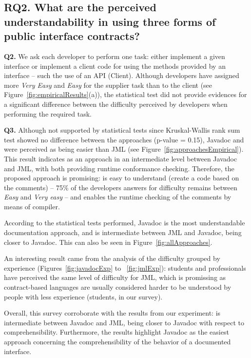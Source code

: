 \subsection{RQ2. What are the perceived understandability in using three forms of public interface contracts?}
\label{rq2}



\textbf{Q2.} We ask each developer to perform one task:
either implement a given interface or implement a client code for using the
methods provided by an interface -- such the use of an API (Client). 
Although developers have assigned more \emph{Very Easy} and \textit{Easy} for
the supplier task than to the client (see Figure~\ref{fig:empiricalResults}(a)),
the statistical test did not provide evidences for a significant difference
between the difficulty perceived by developers when performing the required
task.

\textbf{Q3.}  Although not supported by statistical tests since Kruskal-Wallis
rank sum test showed no difference between the approaches (p-value = 0.15), Javadoc and
\contractjdoc{} were perceived as being easier than JML (see Figure~\ref{fig:approachesEmpirical}).
This result indicates \contractjdoc{} as an approach in an intermediate level
between Javadoc and JML, with both providing runtime conformance checking. Therefore, the
proposed approach is promising: \contractjdoc{} is easy to understand
(create a code based on the comments) -- 75\% of the developers answers for
difficulty remains between \textit{Easy} and \textit{Very easy} -- and enables
the runtime checking of the comments by means of \contractjdocCompiler{}
compiler.

According to the statistical tests performed, Javadoc is the most
understandable documentation approach, and \contractjdoc{} is intermediate between JML and
Javadoc, being closer to Javadoc.
This can also be seen in Figure~\ref{fig:allApproaches}.

An interesting result came from the analysis of the difficulty grouped by
experience (Figures~\ref{fig:javadocExp} to ~\ref{fig:jmlExp}): students and
professionals have perceived the same level of difficulty for JML, which is
promissing as contract-based languages are usually considered harder to be
understood by people with less experience (students, in our survey).

Overall, this survey corroborate with the results from our experiment: \contractjdoc{} is
intermediate between Javadoc and JML, being closer to Javadoc with respect to
comprehensibility.
Furthermore, the results highlight Javadoc as the easiest approach concerning the comprehensibility of
the behavior of a documented interface.


